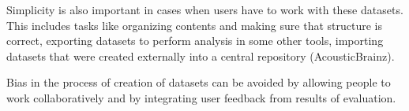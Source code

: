 Simplicity is also important in cases when users have to work with these datasets. This includes tasks like organizing contents and making sure that structure is correct, exporting datasets to perform analysis in some other tools, importing datasets that were created externally into a central repository (AcousticBrainz).

Bias in the process of creation of datasets can be avoided by allowing people to work collaboratively and by integrating user feedback from results of evaluation.
